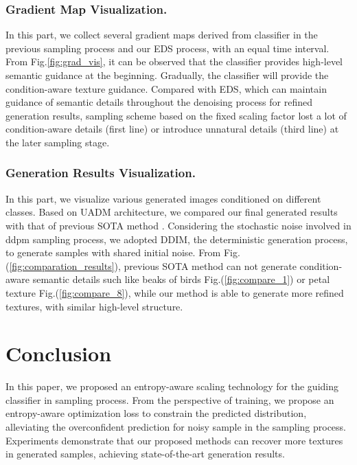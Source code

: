 \documentclass[runningheads]{llncs}
\begin{document}
\subsubsection{Gradient Map Visualization.}
In this part, we collect several gradient maps  derived from classifier in the previous sampling process and our EDS process, with an equal time interval.
From Fig.\ref{fig:grad_vis}, it can be observed that the classifier provides high-level semantic guidance at the beginning.
Gradually, the classifier will provide the condition-aware texture guidance.
Compared with EDS, which can maintain guidance of semantic details throughout the denoising process for refined generation results, sampling scheme based on the fixed scaling factor lost a lot of condition-aware details (first line) or introduce unnatural details (third line) at the later sampling stage.




\subsubsection{Generation Results Visualization.}
In this part, we visualize various generated images conditioned on different classes.
Based on UADM architecture, we compared our final generated results with that of previous SOTA method \cite{dhariwal2021diffusion}.
Considering the stochastic noise involved in ddpm sampling process, we adopted DDIM, the deterministic generation process, to generate samples with shared initial noise.
From Fig.(\ref{fig:comparation_results}), previous SOTA method can not generate condition-aware semantic details such like beaks of birds Fig.(\ref{fig:compare_1}) or petal texture Fig.(\ref{fig:compare_8}), while our method is able to generate more refined textures, with similar high-level structure.








\section{Conclusion}
In this paper, we proposed an entropy-aware scaling technology for the guiding classifier in sampling process.
From the perspective of training, we propose an entropy-aware optimization loss to constrain the predicted distribution, alleviating the overconfident prediction for noisy sample in the sampling process.
Experiments demonstrate that our proposed methods can recover more textures in generated samples,
achieving state-of-the-art generation results.
\end{document}

